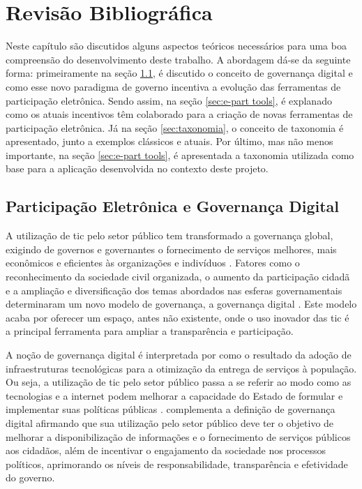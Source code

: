 \chapter[Revisão Bibliográfica]{Revisão Bibliográfica} 
\label{cap:cap2}
Neste capítulo são discutidos alguns aspectos teóricos necessários para uma boa compreensão do desenvolvimento deste trabalho. A abordagem dá-se da seguinte forma:
primeiramente na seção \ref{sec:e-part}, é discutido o conceito de governança digital e como esse novo paradigma de governo incentiva a evolução das ferramentas de 
participação eletrônica. Sendo assim, na seção \ref{sec:e-part tools}, é explanado como os atuais incentivos têm colaborado para a criação de novas ferramentas de 
participação eletrônica. Já na seção \ref{sec:taxonomia}, o conceito de taxonomia é apresentado, junto a exemplos clássicos e atuais. Por último, mas não menos importante, 
na seção \ref{sec:e-part tools}, é apresentada a taxonomia utilizada como base para a aplicação desenvolvida no contexto deste projeto. 


\section{Participação Eletrônica e Governança Digital}
\label{sec:e-part}
\par
A utilização de \acrshort{tic} pelo setor público tem transformado a governança global, exigindo de governos e governantes o fornecimento de serviços melhores, 
mais econômicos e eficientes às organizações e indivíduos \cite{afdb2014uneca}. Fatores como o reconhecimento da sociedade civil organizada, o aumento da participação cidadã e a 
ampliação e diversificação dos temas abordados nas esferas governamentais determinaram um novo modelo de governança, a governança digital \cite{o2011government}. 
Este modelo acaba por oferecer um espaço, antes não existente, onde o uso inovador das \acrshort{tic} é a principal ferramenta para ampliar a transparência e participação.

\par
A noção de governança digital é interpretada por  como o resultado da adoção de infraestruturas tecnológicas para a otimização da entrega de 
serviços à população. Ou seja, a utilização de \acrshort{tic} pelo setor público passa a se referir ao modo como as tecnologias e a internet podem melhorar a capacidade do Estado 
de formular e implementar suas políticas públicas \cite{parra2017governancca}.  complementa a definição de governança digital afirmando que sua 
utilização pelo setor público deve ter o objetivo de melhorar a disponibilização de informações e o fornecimento de serviços públicos aos cidadãos, 
além de incentivar o engajamento da sociedade nos processos políticos, aprimorando os níveis de responsabilidade, transparência e efetividade do governo.

